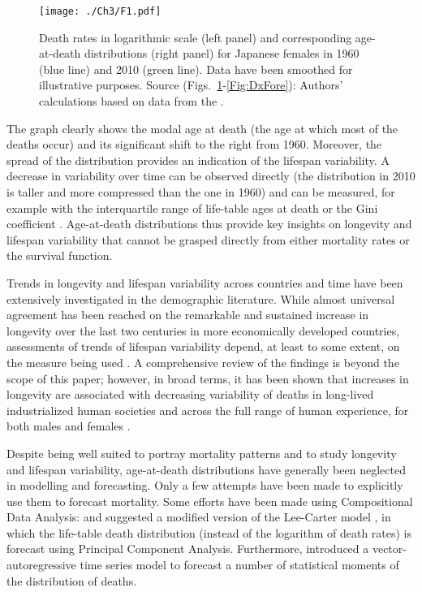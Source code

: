 \documentclass[Thesis]{subfiles}
\begin{document}
\begin{figure}[!ht]
	\begin{center}		
		\texttt{[image: ./Ch3/F1.pdf]}	
		\caption{Death rates in logarithmic scale (left panel) and corresponding age-at-death distributions (right panel) for Japanese females in 1960 (blue line) and 2010 (green line). Data have been smoothed for illustrative purposes. Source (Figs.~\ref{Fig:MxLxDxCurves}-\ref{Fig:DxFore}): Authors' calculations based on data from the \cite{HMD}.\label{Fig:MxLxDxCurves}}			
	\end{center}
\end{figure}

The graph clearly shows the modal age at death (the age at which most of the deaths occur) and its significant shift to the right from 1960. Moreover, the spread of the distribution provides an indication of the lifespan variability. A decrease in variability over time can be observed directly (the distribution in 2010 is taller and more compressed than the one in 1960) and can be measured, for example with the interquartile range of life-table ages at death or the Gini coefficient \citep[for comprehensive reviews, see][]{wilmoth1999rectangularization,van2013perturbation}. Age-at-death distributions thus provide key insights on longevity and lifespan variability that cannot be grasped directly from either mortality rates or the survival function.

Trends in longevity and lifespan variability across countries and time have been extensively investigated in the demographic literature. While almost universal agreement has been reached on the remarkable and sustained increase in longevity over the last two centuries in more economically developed countries, assessments of trends of lifespan variability depend, at least to some extent, on the measure being used \citep[see, for
example,][pp.~314-318]{shkolnikov2003gini}. A comprehensive review of the findings is beyond the scope of this paper; however, in broad terms, it has been shown that increases in longevity are associated with decreasing variability of deaths in long-lived industrialized human societies \citep{smits2009length,vaupel2011life} and across the full range of human experience, for both males and females \citep{colchero2016emergence}. 

Despite being well suited to portray mortality patterns and to study longevity and lifespan variability, age-at-death distributions have generally been neglected in modelling and forecasting. Only a few attempts have been made to explicitly use them to forecast mortality. Some efforts have been made using Compositional Data Analysis: \cite{oeppen2008coherent} and \cite{bergeron2017coherent} suggested a modified version of the Lee-Carter model \citep{lee1992modeling}, in which the life-table death distribution (instead of the logarithm of death rates) is forecast using Principal Component Analysis. Furthermore, \cite{pascariu2019maximum} introduced a vector-autoregressive time series model to forecast a number of statistical moments of the distribution of deaths.
\end{document}
